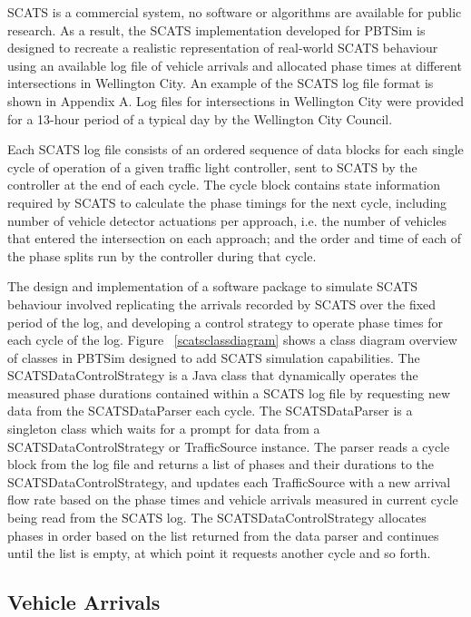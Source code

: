 SCATS is a commercial system, no software or algorithms are available for public research. As a result, the SCATS implementation developed for PBTSim is designed to recreate a realistic representation of real-world SCATS behaviour using an available log file of vehicle arrivals and allocated phase times at different intersections in Wellington City. An example of the SCATS log file format is shown in Appendix A. Log files for intersections in Wellington City were provided for a 13-hour period of a typical day by the Wellington City Council.

Each SCATS log file consists of an ordered sequence of data blocks for each single cycle of operation of a given traffic light controller, sent to SCATS by the controller at the end of each cycle. The cycle block contains state information required by SCATS to calculate the phase timings for the next cycle, including number of vehicle detector actuations per approach, i.e. the number of vehicles that entered the intersection on each approach; and the order and time of each of the phase splits run by the controller during that cycle. 

The design and implementation of a software package to simulate SCATS behaviour involved replicating the arrivals recorded by SCATS over the fixed period of the log, and developing a control strategy to operate phase times for each cycle of the log. Figure ~\ref{scatsclassdiagram} shows a class diagram overview of classes in PBTSim designed to add SCATS simulation capabilities. The SCATSDataControlStrategy is a Java class that dynamically operates the measured phase durations contained within a SCATS log file by requesting new data from the SCATSDataParser each cycle. The SCATSDataParser is a singleton class which waits for a prompt for data from a SCATSDataControlStrategy or TrafficSource instance. The parser reads a cycle block from the log file and returns a list of phases and their durations to the SCATSDataControlStrategy, and updates each TrafficSource with a new arrival flow rate based on the phase times and vehicle arrivals measured in current cycle being read from the SCATS log. The SCATSDataControlStrategy allocates phases in order based on the list returned from the data parser and continues until the list is empty, at which point it requests another cycle and so forth.

\subsection{Vehicle Arrivals}

